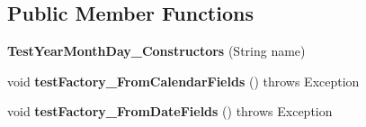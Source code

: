 \subsection*{Public Member Functions}
\begin{DoxyCompactItemize}
\item 
\hypertarget{classorg_1_1joda_1_1time_1_1_test_year_month_day___constructors_aa064c488e54ceb0548c5ab8e715d8fee}{{\bfseries Test\-Year\-Month\-Day\-\_\-\-Constructors} (String name)}\label{classorg_1_1joda_1_1time_1_1_test_year_month_day___constructors_aa064c488e54ceb0548c5ab8e715d8fee}

\item 
\hypertarget{classorg_1_1joda_1_1time_1_1_test_year_month_day___constructors_ab18e5585bec451ce03a162c339add93d}{void {\bfseries test\-Factory\-\_\-\-From\-Calendar\-Fields} ()  throws Exception }\label{classorg_1_1joda_1_1time_1_1_test_year_month_day___constructors_ab18e5585bec451ce03a162c339add93d}

\item 
\hypertarget{classorg_1_1joda_1_1time_1_1_test_year_month_day___constructors_ad31cfad824170ec60eb118df482509de}{void {\bfseries test\-Factory\-\_\-\-From\-Date\-Fields} ()  throws Exception }\label{classorg_1_1joda_1_1time_1_1_test_year_month_day___constructors_ad31cfad824170ec60eb118df482509de}


\end{DoxyCompactItemize}
